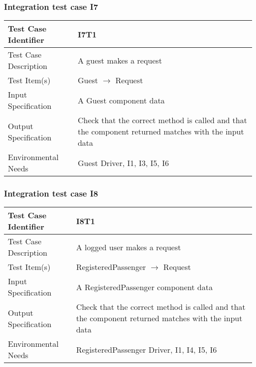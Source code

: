 		\subsubsection{Integration test case I7}
		\begin{center}
			\begin{tabular}{ |l p{10cm}| } \hline
				Test Case Identifier & I7T1 \\ \hline
				Test Case Description & A guest makes a request \\ \hline
				Test Item(s) & Guest $\rightarrow$ Request \\ \hline
				Input Specification & A Guest component data \\ \hline
				Output Specification & Check that the correct method is called and that the component returned matches
				with the input data \\ \hline
				Environmental Needs & Guest Driver, I1, I3, I5, I6 \\ \hline
			\end{tabular}
		\end{center}
		\subsubsection{Integration test case I8}
		\begin{center}
			\begin{tabular}{ |l p{10cm}| } \hline
				Test Case Identifier & I8T1 \\ \hline
				Test Case Description & A logged user makes a request \\ \hline
				Test Item(s) & RegisteredPassenger $\rightarrow$ Request \\ \hline
				Input Specification & A RegisteredPassenger component data \\ \hline
				Output Specification & Check that the correct method is called and that the component returned matches
				with the input data \\ \hline
				Environmental Needs & RegisteredPassenger Driver, I1, I4, I5, I6 \\ \hline
			\end{tabular}
		\end{center}
